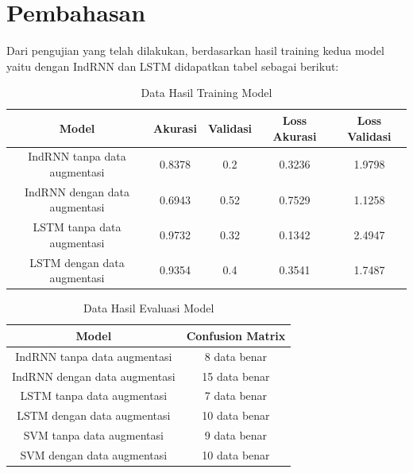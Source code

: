 \newpage
\section{Pembahasan}
\label{sec:analisispengujian}

Dari pengujian yang telah dilakukan, berdasarkan hasil training kedua model
yaitu dengan IndRNN dan LSTM didapatkan tabel sebagai berikut:

\begin{longtable}{|c|c|c|c|c|}
  \caption{Data Hasil Training Model}
  \label{tb:EnergiKecepatan}                                                                                            \\
  \hline
  \rowcolor[HTML]{C0C0C0}
  \textbf{Model}                & \textbf{Akurasi} & \textbf{Validasi} & \textbf{Loss Akurasi} & \textbf{Loss Validasi} \\
  \hline
  IndRNN tanpa data augmentasi  & 0.8378           & 0.2               & 0.3236                & 1.9798                 \\
  IndRNN dengan data augmentasi & 0.6943           & 0.52              & 0.7529                & 1.1258                 \\
  LSTM tanpa data augmentasi    & 0.9732           & 0.32              & 0.1342                & 2.4947                 \\
  LSTM dengan data augmentasi   & 0.9354           & 0.4               & 0.3541                & 1.7487                 \\
  \hline
\end{longtable}

\begin{longtable}{|c|c|}
  \caption{Data Hasil Evaluasi Model}
  \label{tb:EnergiKecepatan}                                \\
  \hline
  \rowcolor[HTML]{C0C0C0}
  \textbf{Model}                & \textbf{Confusion Matrix} \\
  \hline
  IndRNN tanpa data augmentasi  & 8 data benar              \\
  IndRNN dengan data augmentasi & 15 data benar             \\
  LSTM tanpa data augmentasi    & 7 data benar              \\
  LSTM dengan data augmentasi   & 10 data benar             \\
  SVM tanpa data augmentasi     & 9 data benar              \\
  SVM dengan data augmentasi    & 10 data benar             \\
  \hline
\end{longtable}

